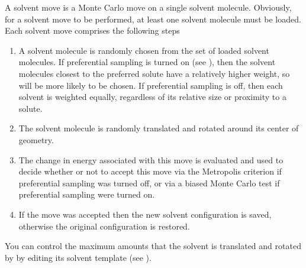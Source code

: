 \documentclass[letterpaper,10pt,english]{sphinxmanual}
\begin{document}
A solvent move is a Monte Carlo move on a single solvent molecule. Obviously, for a solvent move to be performed, at least one solvent molecule must be loaded. Each solvent move comprises the following steps
\begin{enumerate}
\item {} 
A solvent molecule is randomly chosen from the set of loaded solvent molecules. If preferential sampling is turned on (see {\hyperref[\detokenize{protoms:parameters}]{}}), then the solvent molecules closest to the preferred solute have a relatively higher weight, so will be more likely to be chosen. If preferential sampling is off, then each solvent is weighted equally, regardless of its relative size or proximity to a solute.

\item {} 
The solvent molecule is randomly translated and rotated around its center of geometry.

\item {} 
The change in energy associated with this move is evaluated and used to decide whether or not to accept this move via the Metropolis criterion if preferential sampling was turned off, or via a biased Monte Carlo test if preferential sampling were turned on.

\item {} 
If the move was accepted then the new solvent configuration is saved, otherwise the original configuration is restored.

\end{enumerate}

You can control the maximum amounts that the solvent is translated and rotated by by editing its solvent template (see {\hyperref[\detokenize{protoms:temref}]{}}).

\ignorespaces 
{}
\end{document}
